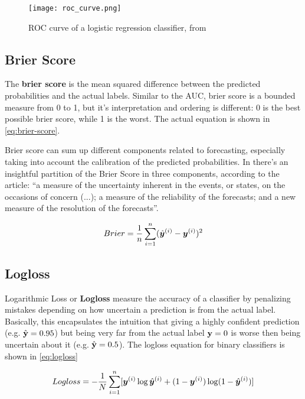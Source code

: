 \begin{figure}[!h]
    \centering
    \texttt{[image: roc\_curve.png]} 
    \caption{ROC curve of a logistic regression classifier, from \cite{kuhn2013applied}}
    \label{fig:auroc}
\end{figure}

\subsection{Brier Score}

The \textbf{brier score} is the mean squared difference between the predicted probabilities and the actual labels. Similar to the AUC, brier score is a bounded measure from 0 to 1, but it's interpretation and ordering is different: 0 is the best possible brier score, while 1 is the worst. The actual equation is shown in \ref{eq:brier-score}.

Brier score can sum up different components related to forecasting, especially taking into account the calibration of the predicted probabilities. In \cite{murphy1973new} there's an insightful partition of the Brier Score in three components, according to the article: ``a measure of the uncertainty inherent in the events, or states, on the occasions of concern (...); a measure of the reliability of the forecasts; and  a new measure of the resolution of the forecasts''.

\begin{equation}\label{eq:brier-score}
    Brier=\frac{1}{n}\sum_{i=1}^{n}(\hat{\bm{y}}^{(i)} - \bm{y}^{(i)})^2
\end{equation}

\subsection{Logloss}

Logarithmic Loss or \textbf{Logloss} measure the accuracy of a classifier by penalizing mistakes depending on how uncertain a prediction is from the actual label. Basically, this encapsulates the intuition that giving a highly confident prediction (e.g. $\hat{\textbf{{\text{\textup{y}}}}} = 0.95$) but being very far from the actual label $\textbf{\text{\textup{y}}} = 0$ is worse then being uncertain about it (e.g.  $\hat{\textbf{{\text{\textup{y}}}}} = 0.5$). The logloss equation for binary classifiers is shown in \ref{eq:logloss}

\begin{equation}\label{eq:logloss}
    Logloss = -\frac{1}{N}\sum_{i=1}^{n}[\bm{y}^{(i)} \log \hat{\bm{y}}^{(i)} + (1 - \bm{y}^{(i)})\log(1 - \hat{\bm{y}}^{(i)})]
\end{equation}




